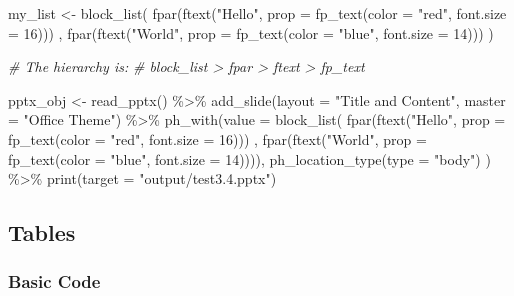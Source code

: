 \documentclass[
]{book}
\newenvironment{Shaded}{\begin{snugshade}}{\end{snugshade}}
\newcommand{\AttributeTok}[1]{\textcolor[rgb]{0.77,0.63,0.00}{#1}}
\newcommand{\CommentTok}[1]{\textcolor[rgb]{0.56,0.35,0.01}{\textit{#1}}}
\newcommand{\DecValTok}[1]{\textcolor[rgb]{0.00,0.00,0.81}{#1}}
\newcommand{\FunctionTok}[1]{\textcolor[rgb]{0.00,0.00,0.00}{#1}}
\newcommand{\NormalTok}[1]{#1}
\newcommand{\OtherTok}[1]{\textcolor[rgb]{0.56,0.35,0.01}{#1}}
\newcommand{\SpecialCharTok}[1]{\textcolor[rgb]{0.00,0.00,0.00}{#1}}
\newcommand{\StringTok}[1]{\textcolor[rgb]{0.31,0.60,0.02}{#1}}
\begin{document}
\begin{Shaded}
\begin{Highlighting}[]
\NormalTok{my\_list }\OtherTok{\textless{}{-}} \FunctionTok{block\_list}\NormalTok{(}
  \FunctionTok{fpar}\NormalTok{(}\FunctionTok{ftext}\NormalTok{(}\StringTok{"Hello"}\NormalTok{, }\AttributeTok{prop =} \FunctionTok{fp\_text}\NormalTok{(}\AttributeTok{color =} \StringTok{"red"}\NormalTok{, }\AttributeTok{font.size =} \DecValTok{16}\NormalTok{))) ,}
  \FunctionTok{fpar}\NormalTok{(}\FunctionTok{ftext}\NormalTok{(}\StringTok{"World"}\NormalTok{, }\AttributeTok{prop =} \FunctionTok{fp\_text}\NormalTok{(}\AttributeTok{color =} \StringTok{"blue"}\NormalTok{, }\AttributeTok{font.size =} \DecValTok{14}\NormalTok{))) )}

\CommentTok{\# The hierarchy is:}
\CommentTok{\# block\_list \textgreater{} fpar \textgreater{} ftext \textgreater{} fp\_text}

\NormalTok{pptx\_obj }\OtherTok{\textless{}{-}} \FunctionTok{read\_pptx}\NormalTok{() }\SpecialCharTok{\%\textgreater{}\%}
  \FunctionTok{add\_slide}\NormalTok{(}\AttributeTok{layout =} \StringTok{"Title and Content"}\NormalTok{, }\AttributeTok{master =} \StringTok{"Office Theme"}\NormalTok{) }\SpecialCharTok{\%\textgreater{}\%}
  \FunctionTok{ph\_with}\NormalTok{(}\AttributeTok{value =} \FunctionTok{block\_list}\NormalTok{(}
    \FunctionTok{fpar}\NormalTok{(}\FunctionTok{ftext}\NormalTok{(}\StringTok{"Hello"}\NormalTok{, }\AttributeTok{prop =} \FunctionTok{fp\_text}\NormalTok{(}\AttributeTok{color =} \StringTok{"red"}\NormalTok{, }\AttributeTok{font.size =} \DecValTok{16}\NormalTok{))) ,}
    \FunctionTok{fpar}\NormalTok{(}\FunctionTok{ftext}\NormalTok{(}\StringTok{"World"}\NormalTok{, }\AttributeTok{prop =} \FunctionTok{fp\_text}\NormalTok{(}\AttributeTok{color =} \StringTok{"blue"}\NormalTok{, }\AttributeTok{font.size =} \DecValTok{14}\NormalTok{)))),}
    \FunctionTok{ph\_location\_type}\NormalTok{(}\AttributeTok{type =} \StringTok{"body"}\NormalTok{)}
\NormalTok{  ) }\SpecialCharTok{\%\textgreater{}\%}
  \FunctionTok{print}\NormalTok{(}\AttributeTok{target =} \StringTok{"output/test3.4.pptx"}\NormalTok{) }
\end{Highlighting}
\end{Shaded}

\hypertarget{tables}{%
\subsection{Tables}\label{tables}}

\hypertarget{basic-code}{%
\subsubsection{Basic Code}\label{basic-code}}
\end{document}

